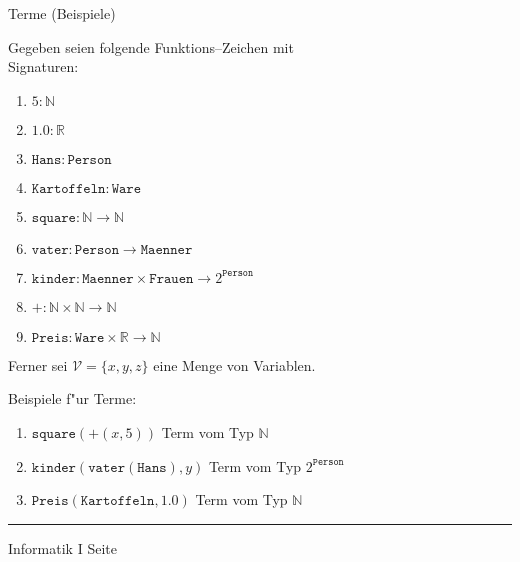 
\begin{slide}{}
\normalsize
\begin{center}
Terme (Beispiele)
\end{center}
\vspace{0.5cm}

\footnotesize
Gegeben seien folgende Funktions--Zeichen mit\\ Signaturen:
\begin{enumerate}
\item $5: \mathbb{N}$
\item $1.0: \mathbb{R}$
\item $\mathtt{Hans}: \mathtt{Person}$
\item $\mathtt{Kartoffeln}: \mathtt{Ware}$
\item $\mathtt{square}: \mathbb{N} \rightarrow \mathbb{N}$
\item $\mathtt{vater}: \mathtt{Person} \rightarrow \mathtt{Maenner}$
\item $\mathtt{kinder}: \mathtt{Maenner} \times \mathtt{Frauen} \rightarrow 2^\mathtt{Person}$
\item $+: \mathbb{N} \times \mathbb{N} \rightarrow \mathbb{N}$
\item $\mathtt{Preis}: \mathtt{Ware} \times \mathbb{R} \rightarrow \mathbb{N}$
\end{enumerate}

Ferner sei $\mathcal{V} = \{x, y, z\}$ eine Menge von Variablen.

Beispiele f"ur Terme:
\begin{enumerate}
\item $\mathtt{square}(+(x,5))$ \quad Term vom Typ $\mathbb{N}$
\item $\mathtt{kinder}(\mathtt{vater}(\mathtt{Hans}), y)$ \quad Term vom Typ $2^\mathtt{Person}$
\item $\mathtt{Preis}(\mathtt{Kartoffeln}, 1.0)$ \quad Term vom Typ $\mathbb{N}$
\end{enumerate}

\vspace*{\fill}
\tiny \addtocounter{mypage}{1}
\rule{15cm}{1mm}
Informatik I  \hspace*{\fill} Seite 
\end{slide}


